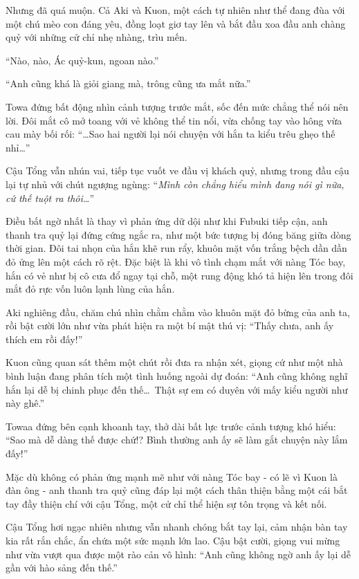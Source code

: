 \documentclass[../main.tex]{subfiles}
\begin{document}
Nhưng đã quá muộn. Cả Aki và Kuon, một cách tự nhiên như thể đang đùa với một chú mèo con đáng yêu, đồng loạt giơ tay lên và bắt đầu xoa đầu anh chàng quỷ với những cử chỉ nhẹ nhàng, trìu mến.

``Nào, nào, Ác quỷ-kun, ngoan nào.''

``Anh cũng khá là giỏi giang mà, trông cũng ưa mắt nữa.''

Towa đứng bất động nhìn cảnh tượng trước mắt, sốc đến mức chẳng thể nói nên lời. Đôi mắt cô mở toang với vẻ không thể tin nổi, vừa chống tay vào hông vừa cau mày bối rối: ``\dots Sao hai người lại nói chuyện với hắn ta kiểu trêu ghẹo thế nhỉ\dots''

Cậu Tổng vẫn nhún vai, tiếp tục vuốt ve đầu vị khách quỷ, nhưng trong đầu cậu lại tự nhủ với chút ngượng ngùng: ``\textit{Mình còn chẳng hiểu mình đang nói gì nữa, cứ thế tuột ra thôi\dots}''

Điều bất ngờ nhất là thay vì phản ứng dữ dội như khi Fubuki tiếp cận, anh thanh tra quỷ lại đứng cứng ngắc ra, như một bức tượng bị đóng băng giữa dòng thời gian. Đôi tai nhọn của hắn khẽ run rẩy, khuôn mặt vốn trắng bệch dần dần đỏ ửng lên một cách rõ rệt. Đặc biệt là khi vô tình chạm mắt với nàng Tóc bay, hắn có vẻ như bị cô cưa đổ ngay tại chỗ, một rung động khó tả hiện lên trong đôi mắt đỏ rực vốn luôn lạnh lùng của hắn.


Aki nghiêng đầu, chăm chú nhìn chằm chằm vào khuôn mặt đỏ bừng của anh ta, rồi bật cười lớn như vừa phát hiện ra một bí mật thú vị: ``Thấy chưa, anh ấy thích em rồi đấy!''

Kuon cũng quan sát thêm một chút rồi đưa ra nhận xét, giọng cứ như một nhà bình luận đang phân tích một tình huống ngoài dự đoán: ``Anh cũng không nghĩ hắn lại dễ bị chinh phục đến thế\dots\ Thật sự em có duyên với mấy kiểu người như này ghê.''

Towaa đứng bên cạnh khoanh tay, thở dài bất lực trước cảnh tượng khó hiểu: ``Sao mà dễ dàng thế được chứ!? Bình thường anh ấy sẽ làm gắt chuyện này lắm đấy!''

Mặc dù không có phản ứng mạnh mẽ như với nàng Tóc bay - có lẽ vì Kuon là đàn ông - anh thanh tra quỷ cũng đáp lại một cách thân thiện bằng một cái bắt tay đầy thiện chí với cậu Tổng, một cử chỉ thể hiện sự tôn trọng và kết nối.

Cậu Tổng hơi ngạc nhiên nhưng vẫn nhanh chóng bắt tay lại, cảm nhận bàn tay kia rất rắn chắc, ẩn chứa một sức mạnh lớn lao. Cậu bật cười, giọng vui mừng như vừa vượt qua được một rào cản vô hình: ``Anh cũng không ngờ anh ấy lại dễ gần với hào sảng đến thế.''
\end{document}
